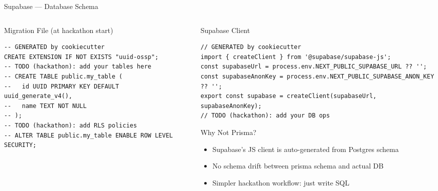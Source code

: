 \documentclass[10pt,aspectratio=169,t]{beamer}
\begin{document}
\begin{frame}{Supabase --- Database Schema}

  \begin{columns}

    \begin{column}{0.55\paperwidth}

      \begin{block}{Migration File (at hackathon start)}
        \ttfamily\scriptsize
        \begin{verbatim}
-- GENERATED by cookiecutter
CREATE EXTENSION IF NOT EXISTS "uuid-ossp";
-- TODO (hackathon): add your tables here
-- CREATE TABLE public.my_table (
--   id UUID PRIMARY KEY DEFAULT uuid_generate_v4(),
--   name TEXT NOT NULL
-- );
-- TODO (hackathon): add RLS policies
-- ALTER TABLE public.my_table ENABLE ROW LEVEL SECURITY;
        \end{verbatim}
      \end{block}

    \end{column}

    \begin{column}{0.4\paperwidth}

      \begin{block}{Supabase Client}
        \ttfamily\scriptsize
        \begin{verbatim}
// GENERATED by cookiecutter
import { createClient } from '@supabase/supabase-js';
const supabaseUrl = process.env.NEXT_PUBLIC_SUPABASE_URL ?? '';
const supabaseAnonKey = process.env.NEXT_PUBLIC_SUPABASE_ANON_KEY ?? '';
export const supabase = createClient(supabaseUrl, supabaseAnonKey);
// TODO (hackathon): add your DB ops
        \end{verbatim}
      \end{block}

      \begin{block}{Why Not Prisma?}
        \begin{itemize}
          \item Supabase's JS client is auto-generated from Postgres schema
          \item No schema drift between prisma schema and actual DB
          \item Simpler hackathon workflow: just write SQL
        \end{itemize}
      \end{block}

    \end{column}

  \end{columns}

\end{frame}
\end{document}

